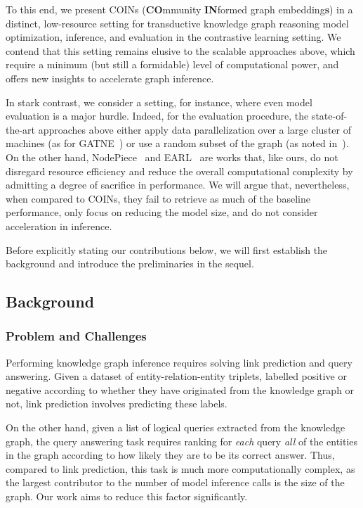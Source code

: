 To this end, we present COINs ({\bf CO}mmunity {\bf IN}formed graph embedding{\bf s}) in a distinct, low-resource setting for transductive knowledge graph reasoning model optimization, inference, and evaluation in the contrastive learning setting. We contend that this setting remains elusive to the scalable approaches above, which require a minimum (but still a formidable) level of computational power, and offers new insights to accelerate graph inference. 

In stark contrast, we consider a setting, for instance, where even model evaluation is a major hurdle. Indeed, for the evaluation procedure, the state-of-the-art approaches above either apply data parallelization over a large cluster of machines (as for GATNE~\cite{cen_representation_2019}) or use a random subset of the graph (as noted in~\cite{ren_smore_2021}). On the other hand, NodePiece~\cite{galkin_nodepiece_2022} and EARL~\cite{chen_entity-agnostic_2023} are works that, like ours, do not disregard resource efficiency and reduce the overall computational complexity by admitting a degree of sacrifice in performance. We will argue that, nevertheless, when compared to COINs, they fail to retrieve as much of the baseline performance, only focus on reducing the model size, and do not consider acceleration in inference.

Before explicitly stating our contributions below, we will first establish the background and introduce the preliminaries in the sequel. 

\subsection{Background}
\label{sec:background}
\subsubsection{Problem and Challenges}

Performing knowledge graph inference requires solving link prediction and query answering. Given a dataset of entity-relation-entity triplets, labelled positive or negative according to whether they have originated from the knowledge graph or not, link prediction involves predicting these labels. 

On the other hand, given a list of logical queries extracted from the knowledge graph, the query answering task requires ranking for \emph{each} query \emph{all} of the entities in the graph according to how likely they are to be its correct answer. Thus, compared to link prediction, this task is much more computationally complex, as the largest contributor to the number of model inference calls is the size of the graph. Our work aims to reduce this factor significantly.


